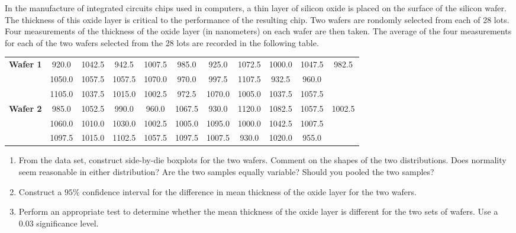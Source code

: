 \begin{Exercise}
    In the manufacture of integrated circuits chips used in computers, a thin layer 
    of silicon oxide is placed on the surface of the silicon wafer. The thickness of this oxide layer
    is critical to the performance of the resulting chip. 
    Two wafers are rondomly selected from each of 28 lots. Four measurements of the 
    thickness of the oxide layer (in nanometers) on each wafer are then taken. 
    The average of the four measurements for each of the two wafers selected from the 
    28 lots are recorded in the following table.

    \begin{center}
        \begin{tabular}{|c|c|c|c|c|c|c|c|c|c|c|}
        \hline
        \textbf{Wafer 1} & 920.0 & 1042.5 & 942.5 & 1007.5 & 985.0 & 925.0 & 1072.5 & 1000.0 & 1047.5 & 982.5\\
        & 1050.0 & 1057.5 & 1057.5 & 1070.0 & 970.0 & 997.5 & 1107.5 & 932.5 & 960.0 & \\
        & 1105.0 & 1037.5 & 1015.0 & 1002.5 & 972.5 & 1070.0 & 1005.0 & 1037.5 & 1057.5 & \\
        \hline 
        \textbf{Wafer 2} & 985.0 & 1052.5 & 990.0 & 960.0 & 1067.5 & 930.0 & 1120.0 & 1082.5 & 1057.5 & 1002.5\\
        & 1060.0 & 1010.0 & 1030.0 & 1002.5 & 1005.0 & 1095.0 & 1000.0 & 1042.5 & 1007.5 & \\
        & 1097.5 & 1015.0 & 1102.5 & 1057.5 & 1097.5 & 1007.5 & 930.0 & 1020.0 & 955.0 & \\
        \hline
        \end{tabular}
    \end{center}

    \begin{enumerate}
        \item From the data set, construct side-by-die boxplots for the two wafers. 
        Comment on the shapes of the two distributions. Does normality seem reasonable 
        in either distribution? Are the two samples equally variable? Should you pooled the 
        two samples?

        \item Construct a $95\%$ confidence interval for the difference in mean thickness of the 
        oxide layer for the two wafers.

        \item Perform an appropriate test to determine whether the mean thickness of the 
        oxide layer is different for the two sets of wafers. Use a $0.03$ significance level.
    \end{enumerate}
\end{Exercise}